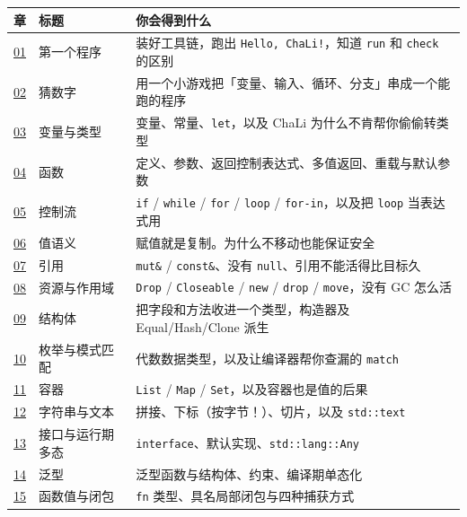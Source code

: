 {\small\setlength{\tabcolsep}{4pt}
\begin{longtable}{>{\raggedright\arraybackslash}p{}>{\raggedright\arraybackslash}p{}>{\raggedright\arraybackslash}p{}}
\toprule
章 & 标题 & 你会得到什么 \\
\midrule
\endhead
\hyperref[ch:01]{01} & 第一个程序 & 装好工具链，跑出 \texttt{Hello,\allowbreak{} Cha\allowbreak{}Li!}，知道 \texttt{run} 和 \texttt{check} 的区别 \\
\hyperref[ch:02]{02} & 猜数字 & 用一个小游戏把「变量、输入、循环、分支」串成一个能跑的程序 \\
\hyperref[ch:03]{03} & 变量与类型 & 变量、常量、\texttt{let}，以及 ChaLi 为什么不肯帮你偷偷转类型 \\
\hyperref[ch:04]{04} & 函数 & 定义、参数、返回控制表达式、多值返回、重载与默认参数 \\
\hyperref[ch:05]{05} & 控制流 & \texttt{if} / \texttt{while} / \texttt{for} / \texttt{loop} / \texttt{for-in}，以及把 \texttt{loop} 当表达式用 \\
\hyperref[ch:06]{06} & 值语义 & 赋值就是复制。为什么不移动也能保证安全 \\
\hyperref[ch:07]{07} & 引用 & \texttt{mut\&} / \texttt{const\&}、没有 \texttt{null}、引用不能活得比目标久 \\
\hyperref[ch:08]{08} & 资源与作用域 & \texttt{Drop} / \texttt{Closeable} / \texttt{new} / \texttt{drop} / \texttt{move}，没有 GC 怎么活 \\
\hyperref[ch:09]{09} & 结构体 & 把字段和方法收进一个类型，构造器及 Equal/Hash/Clone 派生 \\
\hyperref[ch:10]{10} & 枚举与模式匹配 & 代数数据类型，以及让编译器帮你查漏的 \texttt{match} \\
\hyperref[ch:11]{11} & 容器 & \texttt{List} / \texttt{Map} / \texttt{Set}，以及容器也是值的后果 \\
\hyperref[ch:12]{12} & 字符串与文本 & 拼接、下标（按字节！）、切片，以及 \texttt{std:\allowbreak{}:\allowbreak{}text} \\
\hyperref[ch:13]{13} & 接口与运行期多态 & \texttt{interface}、默认实现、\texttt{std:\allowbreak{}:\allowbreak{}lang:\allowbreak{}:\allowbreak{}Any} \\
\hyperref[ch:14]{14} & 泛型 & 泛型函数与结构体、约束、编译期单态化 \\
\hyperref[ch:15]{15} & 函数值与闭包 & \texttt{fn} 类型、具名局部闭包与四种捕获方式 \\

\end{longtable}}
